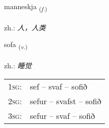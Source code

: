 \documentclass[frontgrid, backgrid]{flacards}\usepackage[]{graphicx}\usepackage[]{xcolor}
\begin{document}
\renewcommand{\flhead}{\vskip5pt \fboxsep=0pt {\small\bfseries\footnotesize Nafnorð | 名词}}
\renewcommand{\fcfoot}{\vskip5pt \fboxsep=0pt \hspace{2pt}{\small\bfseries\footnotesize 1K}}

\renewcommand{\blhead}{\vskip5pt {\small\bfseries\footnotesize Nafnorð | 名词 }}
\renewcommand{\bcfoot}{\vskip5pt \hspace{2pt}{\small\bfseries\footnotesize 1K}}


{manneskja \small{\textsubscript{(\textit{f.})}} \\[1ex] %
\textphonetic{[manɛsca]} \\
zh.: \emph{人，人类} \\  [2ex]
\renewcommand*{\arraystretch}{0.8}
}

\renewcommand{\flhead}{\vskip5pt \fboxsep=0pt {\small\bfseries\footnotesize Sagnorð | 动词}}
\renewcommand{\fcfoot}{\vskip5pt \fboxsep=0pt \hspace{2pt}{\small\bfseries\footnotesize 1K}}

\renewcommand{\blhead}{\vskip5pt {\small\bfseries\footnotesize Sagnorð | 动词 }}
\renewcommand{\bcfoot}{\vskip5pt \hspace{2pt}{\small\bfseries\footnotesize 1K}}


{sofa \small{\textsubscript{(\textit{v.})}} \\[1ex] %
\textphonetic{[sɔːva]} \\
zh.: \emph{睡觉} \\  [2ex]
\renewcommand*{\arraystretch}{0.8}
\begin{tabular}{p{1cm}l}
\textsc{1sg}: & sef -- svaf -- sofið \\ 
\textsc{2sg}: & sefur -- svafst -- sofið \\ 
\textsc{3sg}: & sefur -- svaf -- sofið \\ 
\end{tabular}
}
\end{document}
